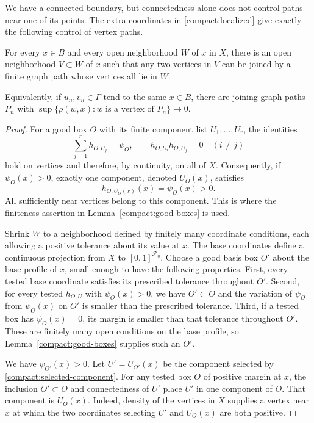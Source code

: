 We have a connected boundary, but connectedness alone does not control
paths near one of its points.  The extra coordinates in
\eqref{compact:localized} give exactly the following control of vertex
paths.

\begin{lemma}\label{compact:near-path}
For every $x\in B$ and every open neighborhood $W$ of $x$ in $X$, there
is an open neighborhood $V\subset W$ of $x$ such that any two vertices
in $V$ can be joined by a finite graph path whose vertices all lie in
$W$.

Equivalently, if $u_n,v_n\in\Gamma$ tend to the same $x\in B$, there
are joining graph paths $P_n$ with
$\sup\{\rho(w,x):w\text{ is a vertex of }P_n\}\to0$.
\end{lemma}

\begin{proof}
For a good box $O$ with its finite component list $U_1,\ldots,U_r$,
the identities
\begin{equation}\label{compact:component-identities}
 \sum_{j=1}^r h_{O,U_j}=\psi_O,
 \qquad h_{O,U_i}h_{O,U_j}=0\quad(i\ne j)
\end{equation}
hold on vertices and therefore, by continuity, on all of $X$.
Consequently, if $\psi_O(x)>0$, exactly one component, denoted
$U_O(x)$, satisfies
\begin{equation}\label{compact:selected-component}
 h_{O,U_O(x)}(x)=\psi_O(x)>0.
\end{equation}
All sufficiently near vertices belong to this component.  This is
where the finiteness assertion in Lemma~\ref{compact:good-boxes} is
used.

Shrink $W$ to a neighborhood defined by finitely many coordinate
conditions, each allowing a positive tolerance about its value at
$x$.  The base coordinates define a continuous projection from $X$
to $[0,1]^{\mathcal F_0}$.  Choose a good basis box $O'$ about the base
profile of $x$, small enough to have the following properties.
First, every tested base coordinate satisfies its prescribed tolerance
throughout $O'$.  Second, for every tested $h_{O,U}$ with
$\psi_O(x)>0$, we have $O'\subset O$ and the variation of $\psi_O$
from $\psi_O(x)$ on $O'$ is smaller than the prescribed tolerance.
Third, if a tested box has $\psi_O(x)=0$, its margin is smaller than
that tolerance throughout $O'$.  These are finitely many open
conditions on the base profile, so Lemma~\ref{compact:good-boxes}
supplies such an $O'$.

We have $\psi_{O'}(x)>0$.  Let $U'=U_{O'}(x)$ be the component selected
by \eqref{compact:selected-component}.  For any tested box $O$ of
positive margin at $x$, the inclusion $O'\subset O$ and connectedness
of $U'$ place $U'$ in one component of $O$.  That component is
$U_O(x)$.  Indeed, density of the vertices in $X$ supplies a vertex
near $x$ at which the two coordinates selecting $U'$ and $U_O(x)$ are
both positive.


\end{proof}
